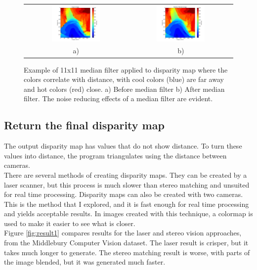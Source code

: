 \documentclass[11pt,fleqn]{article}
\begin{document}
\begin{figure}[!h]
\begin{mdframed}
\centering
\begin{tabular}{cc}
\includegraphics[width=0.49\textwidth, trim=60 10 25 10, clip]{images/median1.png} &
\includegraphics[width=0.49\textwidth, trim=60 10 25 10, clip]{images/median2.png}\\[2pt]
a) & b) \\
\end{tabular}
\caption[Example of 11x11 median filter applied to disparity map]{Example of 11x11 median filter applied to disparity map where the colors correlate with distance, with cool colors (blue) are far away and hot colors (red) close. a) Before median filter b) After median filter. 
The noise reducing effects of a median filter are evident.}
\label{fig:medians}
\end{mdframed}
\end{figure}
\subsection{Return the final disparity map}

The output disparity map has values that do not show distance. To turn these values into distance, the program triangulates using the distance between cameras.\\[5pt]
%
There are several methods of creating disparity maps. They can be created by a laser scanner, but this process is much slower than stereo matching and unsuited for real time processing. Disparity maps can also be created with two cameras. This is the method that I explored, and it is fast enough for real time processing and yields acceptable results. In images created with this technique, a colormap is used to make it easier to see what is closer.\\[5pt]
%
Figure \ref{fig:result1} compares results for the laser and stereo vision approaches, from the Middlebury Computer Vision dataset. The laser result is crisper, but it takes much longer to generate. The stereo matching result is worse, with parts of the image blended, but it was generated much faster. 
\end{document}
